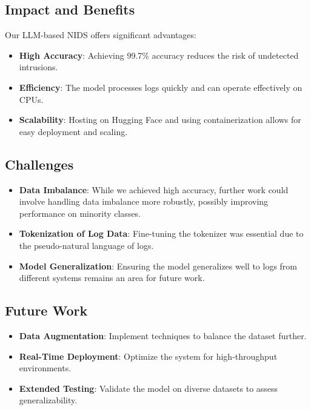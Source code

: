 \documentclass[12pt]{article}
\begin{document}
\subsection{Impact and Benefits}

Our LLM-based NIDS offers significant advantages:

\begin{itemize}
    \item \textbf{High Accuracy}: Achieving 99.7\% accuracy reduces the risk of undetected intrusions.
    \item \textbf{Efficiency}: The model processes logs quickly and can operate effectively on CPUs.
    \item \textbf{Scalability}: Hosting on Hugging Face and using containerization allows for easy deployment and scaling.
\end{itemize}

\subsection{Challenges}

\begin{itemize}
    \item \textbf{Data Imbalance}: While we achieved high accuracy, further work could involve handling data imbalance more robustly, possibly improving performance on minority classes.
    \item \textbf{Tokenization of Log Data}: Fine-tuning the tokenizer was essential due to the pseudo-natural language of logs.
    \item \textbf{Model Generalization}: Ensuring the model generalizes well to logs from different systems remains an area for future work.
\end{itemize}

\subsection{Future Work}

\begin{itemize}
    \item \textbf{Data Augmentation}: Implement techniques to balance the dataset further.
    \item \textbf{Real-Time Deployment}: Optimize the system for high-throughput environments.
    \item \textbf{Extended Testing}: Validate the model on diverse datasets to assess generalizability.
\end{itemize}
\end{document}
